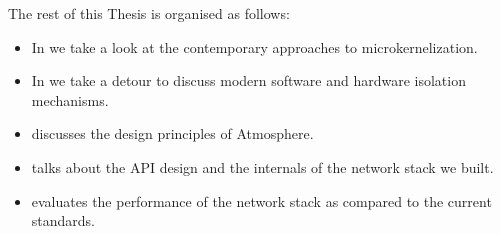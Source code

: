 The rest of this Thesis is organised as follows: 

\begin{itemize}
    \item{In  we take a look at the contemporary approaches to microkernelization. }
    \item{In  we take a detour to discuss modern software and hardware isolation mechanisms. }
    \item{ discusses the design principles of Atmosphere.}
    \item{ talks about the API design and the internals of the network stack we built.  }
    \item{ evaluates the performance of the network stack as compared to the current standards.}
\end{itemize}
